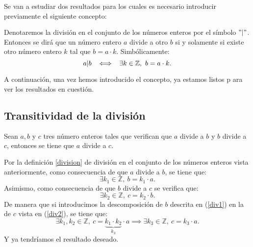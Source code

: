Se van a estudiar dos resultados para los cuales es necesario
introducir previamente el siguiente concepto:
\begin{definicion}\label{division}
	Denotaremos la división en el conjunto de los números enteros por el símbolo
	 \( "|" \). Entonces se dirá que un número entero \(a\) divide a otro \(b\)
	  si y solamente si existe otro número entero \(k\) tal que \(b=a\cdot k\).
	  Simbólicamente:
	  \begin{equation}
	  a|b \hspace{0.2cm} \iff \hspace{0.2cm} \exists k \in \mathbb{Z}, \ b=a\cdot k.
	  \end{equation}
\end{definicion}

A continuación, una vez hemos introducido el concepto, ya estamos listos p
ara ver los resultados en cuestión.

\subsection{Transitividad de la división}
\begin{teorema}
	Sean \(a, b\) y \(c\) tres número enteros tales que verifican
	que \(a\) divide a \(b\) y \(b\) divide a \(c\),
	entonces se tiene que \(a\) divide a \(c\).
\end{teorema}
\begin{demostracion}
	Por la definición \ref{division} de división en el conjunto
	de los números enteros vista anteriormente, como
	consecuencia de que \(a\) divide a \(b\), se tiene que:
	\begin{equation}\label{div1}
	\exists k_1 \in \mathbb{Z}, \ b=k_1 \cdot a.
	\end{equation}
	Asimismo, como consecuencia de que \(b\) divide a \(c\) se
	verifica que:
	\begin{equation}\label{div2}
	\exists k_2 \in \mathbb{Z}, \ c=k_2 \cdot b.
	\end{equation}
	De manera que si introducimos la descomposición de \(b\) descrita
	en (\ref{div1}) en la de \(c\) vista en (\ref{div2}), se tiene que:
	\begin{equation}
	\exists k_1, k_2 \in \mathbb{Z}, \ c=\underbrace{k_1 \cdot k_2}_{k_3} \cdot a
	\implies \exists k_3\in \mathbb{Z}, \ c=k_3 \cdot a .
	\end{equation}
	Y ya tendríamos el resultado deseado.
\end{demostracion}

